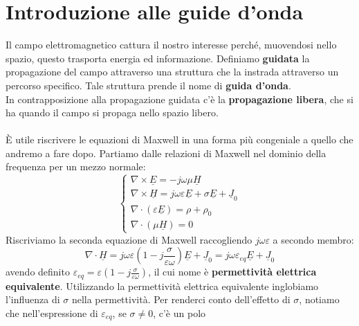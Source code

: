 \documentclass{book}
\begin{document}
        \section{Introduzione alle guide d'onda}
            Il campo elettromagnetico cattura il nostro interesse perché, muovendosi nello spazio,
            questo trasporta energia ed informazione. Definiamo \textbf{guidata} la propagazione del campo attraverso
            una struttura che la instrada attraverso un percorso specifico. Tale struttura prende il nome di \textbf{guida d'onda}. \\
            In contrapposizione alla propagazione guidata c'è la \textbf{propagazione libera}, che si ha quando il campo si
            propaga nello spazio libero. \\ \\
            È utile riscrivere le equazioni di Maxwell in una forma più congeniale a quello che andremo a fare dopo.
            Partiamo dalle relazioni di Maxwell nel dominio della frequenza per un mezzo normale:
            \begin{equation}
                \begin{cases}
                \nabla \times \underline{E} = - j \omega \mu \underline{H} \\
                \nabla \times \underline{H} = j \omega \varepsilon \underline{E}+\sigma \underline{E}+\underline{J}_{0} \\
                \nabla \cdot (\varepsilon \underline{E}) = \rho + \rho_{0} \\
                \nabla \cdot (\mu \underline{H}) = 0
                \end{cases}
            \end{equation}
            Riscriviamo la seconda equazione di Maxwell raccogliendo $j \omega \varepsilon$ a secondo membro:
            \begin{equation}
                \nabla \cdot \underline{H} = j \omega \varepsilon(1 - j \frac{\sigma}{\varepsilon \omega})\underline{E}+\underline{J}_{0} = j \omega\varepsilon_{eq}\underline{E}+\underline{J}_{0}
            \end{equation}
            avendo definito $\displaystyle  \varepsilon_{eq} = \varepsilon(1 - j \frac{\sigma}{\varepsilon \omega})$, il cui nome è 
            \textbf{permettività elettrica equivalente}. Utilizzando la permettività elettrica equivalente inglobiamo l'influenza di $\sigma$ nella
            permettività. Per renderci conto dell'effetto di $\sigma$, notiamo che nell'espressione di $\varepsilon_{eq}$, se $\sigma \neq 0$, c'è un polo 
\end{document}
